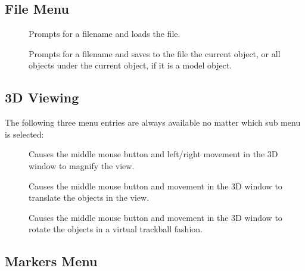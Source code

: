 \subsection{File Menu}

\begin{description}
\item[]  Prompts for a filename and loads the file.
\item[]  Prompts for a filename and saves to the file
        the current object, or all objects under the current object, if it is
        a model object.
\end{description}

\subsection{3D Viewing}

The following three menu entries are always available no matter which sub
menu is selected:

\begin{description}
\item[]  Causes the middle mouse button and left/right movement
                       in the 3D window to magnify the view.
\item[]  Causes the middle mouse button and movement
                       in the 3D window to translate the objects in the view.
\item[]  Causes the middle mouse button and movement
                       in the 3D window to rotate the objects in a virtual
                       trackball fashion.
\end{description}

\subsection{Markers Menu}

